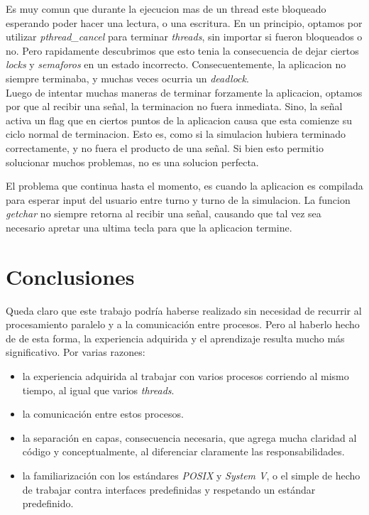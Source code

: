 \documentclass[a4paper,10pt]{article}
\begin{document}
Es muy comun que durante la ejecucion mas de un thread este bloqueado esperando poder hacer una lectura, o una escritura.
En un principio, optamos por utilizar \textit{pthread\_cancel} para terminar \textit{threads}, sin importar si fueron bloqueados o no.
Pero rapidamente descubrimos que esto tenia la consecuencia de dejar ciertos \textit{locks} y \textit{semaforos} en un estado incorrecto.
Consecuentemente, la aplicacion no siempre terminaba, y muchas veces ocurria un \textit{deadlock}.\\

Luego de intentar muchas maneras de terminar forzamente la aplicacion, optamos por que al recibir una señal, la terminacion no fuera inmediata.
Sino, la señal activa un flag que en ciertos puntos de la aplicacion causa que esta comienze su ciclo normal de terminacion.
Esto es, como si la simulacion hubiera terminado correctamente, y no fuera el producto de una señal.
Si bien esto permitio solucionar muchos problemas, no es una solucion perfecta.

El problema que continua hasta el momento, es cuando la aplicacion es compilada para esperar input del usuario entre turno y turno de la simulacion. 
La funcion \textit{getchar} no siempre retorna al recibir una señal, causando que tal vez sea necesario apretar una ultima tecla para que la aplicacion termine.


\newpage
\section{Conclusiones}

Queda claro que este trabajo podría haberse realizado sin necesidad de recurrir al procesamiento paralelo y a la comunicación entre procesos. Pero al haberlo 
hecho de de esta forma, la experiencia adquirida y el aprendizaje resulta mucho más significativo. Por varias razones:

\begin{itemize}
\item la experiencia adquirida al trabajar con varios procesos corriendo al mismo tiempo, al igual que varios \textit{threads}.
\item la comunicación entre estos procesos.
\item la separación en capas, consecuencia necesaria, que agrega mucha claridad al código y conceptualmente, al diferenciar claramente las responsabilidades.
\item la familiarización con los estándares \textit{POSIX} y \textit{System V}, o el simple de hecho de trabajar contra interfaces predefinidas y respetando
      un estándar predefinido.
\end{itemize}
\end{document}
